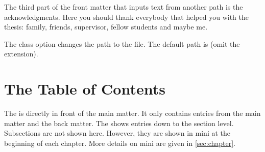 The third part of the front matter that inputs text from another path is the
acknowledgments. Here you should thank everybody that helped you with the
thesis: family, friends, supervisor, fellow students and maybe me.

The class option 
changes the path to the file. The default path is
 (omit the  extension).

\section{The Table of Contents}
The  is directly in front of the main matter. It only contains
entries from the main matter and the back matter. The  shows entries
down to the section level. Subsections are not shown here. However, they are
shown in mini  at the beginning of each chapter. More details on
mini  are given in \autoref{sec:chapter}.

